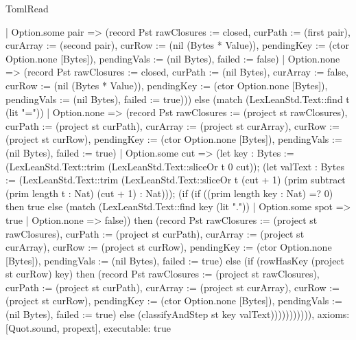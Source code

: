 \begin{lexlean}{TomlRead}
\begin{semanticmodule}
{                   | Option.some pair =>
                       (record Pst {rawClosures := closed, curPath := (first pair), curArray := (second pair), curRow := (nil (Bytes * Value)), pendingKey := (ctor Option.none [Bytes]), pendingVals := (nil Bytes), failed := false})
                   | Option.none => (record Pst {rawClosures := closed, curPath := (nil Bytes), curArray := false, curRow := (nil (Bytes * Value)), pendingKey := (ctor Option.none [Bytes]), pendingVals := (nil Bytes), failed := true})))
              else
                (match (LexLeanStd.Text::find t (lit "="))
                  | Option.none => (record Pst {rawClosures := (project st rawClosures), curPath := (project st curPath), curArray := (project st curArray), curRow := (project st curRow), pendingKey := (ctor Option.none [Bytes]), pendingVals := (nil Bytes), failed := true})
                  | Option.some cut =>
                      (let key : Bytes := (LexLeanStd.Text::trim (LexLeanStd.Text::sliceOr t 0 cut));
                       (let valText : Bytes := (LexLeanStd.Text::trim (LexLeanStd.Text::sliceOr t (cut + 1) (prim subtract (prim length t : Nat) (cut + 1) : Nat)));
                        (if (if ((prim length key : Nat) =? 0) then true else (match (LexLeanStd.Text::find key (lit ".")) | Option.some spot => true | Option.none => false)) then (record Pst {rawClosures := (project st rawClosures), curPath := (project st curPath), curArray := (project st curArray), curRow := (project st curRow), pendingKey := (ctor Option.none [Bytes]), pendingVals := (nil Bytes), failed := true})
                         else (if (rowHasKey (project st curRow) key) then (record Pst {rawClosures := (project st rawClosures), curPath := (project st curPath), curArray := (project st curArray), curRow := (project st curRow), pendingKey := (ctor Option.none [Bytes]), pendingVals := (nil Bytes), failed := true})
                          else (classifyAndStep st key valText))))))))))),
  axioms: [Quot.sound, propext],
  executable: true
}


\end{semanticmodule}
\end{lexlean}
